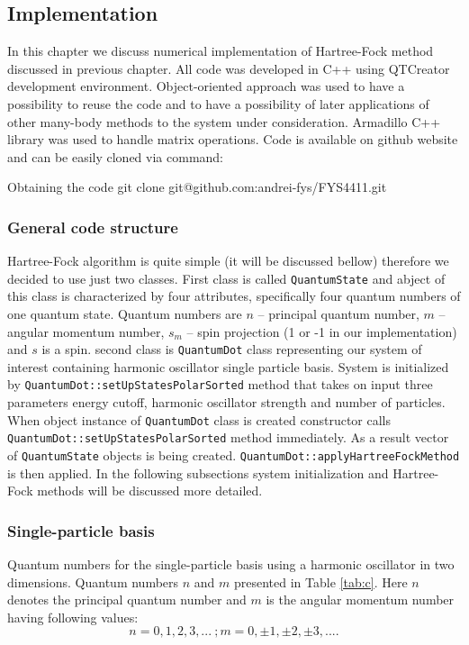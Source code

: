 \documentclass[10pt]{article}
\newcommand{\code}[1]{\colorbox{coding}{\texttt{#1}}}
\begin{document}
\subsection{Implementation}

In this chapter we discuss numerical implementation of Hartree-Fock method discussed in previous chapter.
All code was developed in C++ using QTCreator development environment. Object-oriented approach was used to have a possibility to reuse the code and to have a possibility of later applications of other many-body methods to the system under consideration. Armadillo C++ library was used to handle matrix operations.
Code is available on github website and can be easily cloned via command:
\begin{pseudolisting}{Obtaining the code}
git clone git@github.com:andrei-fys/FYS4411.git
\end{pseudolisting}

\subsubsection{General code structure}
Hartree-Fock algorithm is quite simple (it will be discussed bellow) therefore we decided to use just two classes. First class is called \code{QuantumState} and abject of this class is characterized by four attributes, specifically four quantum numbers of one quantum state. Quantum numbers are $n$ -- principal quantum number, $m$ -- angular momentum number, $s_m$ -- spin projection (1 or -1 in our implementation) and  $s$  is a spin. 
second class is \code{QuantumDot} class representing our system of interest containing harmonic oscillator single particle basis. System is initialized by \code{QuantumDot::setUpStatesPolarSorted} method that takes on input three parameters energy cutoff, harmonic oscillator strength and number of particles.
When object instance of \code{QuantumDot} class is created constructor calls \code{QuantumDot::setUpStatesPolarSorted} method immediately. As a result vector of \code{QuantumState} objects is being created.
\code{QuantumDot::applyHartreeFockMethod} is then applied. In the following subsections system initialization and Hartree-Fock methods will be discussed more detailed.


\subsubsection{Single-particle basis}
Quantum numbers for the single-particle basis using a harmonic oscillator in two dimensions. Quantum numbers $n$ and $m$ presented in Table \ref{tab:c}.
Here $n$ denotes the principal quantum number and $m$ is the angular momentum number having following values:
\[
n = 0, 1, 2, 3, ... \ ;
m = 0, \pm 1, \pm 2, \pm 3, .... 
\]
\end{document}
